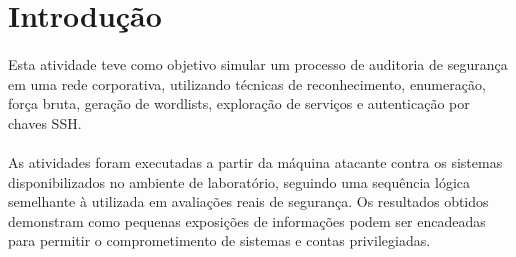 \section{Introdução}

\paragraph{}
Esta atividade teve como objetivo simular um processo de auditoria de segurança
em uma rede corporativa, utilizando técnicas de reconhecimento, enumeração,
força bruta, geração de wordlists, exploração de serviços e autenticação por
chaves SSH.

\paragraph{}
As atividades foram executadas a partir da máquina atacante contra os sistemas
disponibilizados no ambiente de laboratório, seguindo uma sequência lógica
semelhante à utilizada em avaliações reais de segurança. Os resultados obtidos
demonstram como pequenas exposições de informações podem ser encadeadas para
permitir o comprometimento de sistemas e contas privilegiadas.
